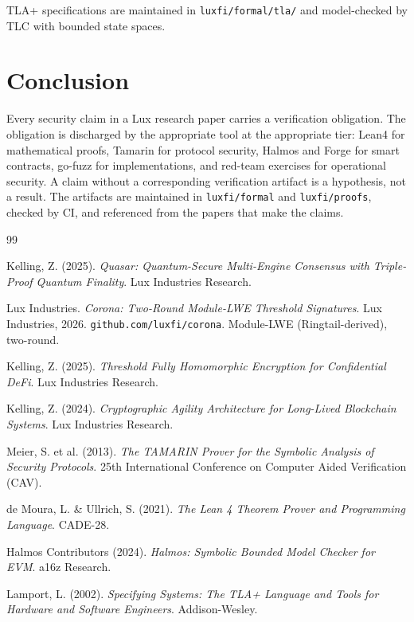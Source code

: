 \documentclass[11pt]{article}
\begin{document}
TLA+ specifications are maintained in \texttt{luxfi/formal/tla/} and model-checked by TLC with bounded state spaces.

\section{Conclusion}

Every security claim in a Lux research paper carries a verification obligation. The obligation is discharged by the appropriate tool at the appropriate tier: Lean4 for mathematical proofs, Tamarin for protocol security, Halmos and Forge for smart contracts, go-fuzz for implementations, and red-team exercises for operational security. A claim without a corresponding verification artifact is a hypothesis, not a result. The artifacts are maintained in \texttt{luxfi/formal} and \texttt{luxfi/proofs}, checked by CI, and referenced from the papers that make the claims.

\begin{thebibliography}{99}

Kelling, Z. (2025).
\textit{Quasar: Quantum-Secure Multi-Engine Consensus with Triple-Proof Quantum Finality}.
Lux Industries Research.

{Lux Industries}.
\textit{Corona: Two-Round Module-LWE Threshold Signatures}.
Lux Industries, 2026. \texttt{github.com/luxfi/corona}.
Module-LWE (Ringtail-derived), two-round.

Kelling, Z. (2025).
\textit{Threshold Fully Homomorphic Encryption for Confidential DeFi}.
Lux Industries Research.

Kelling, Z. (2024).
\textit{Cryptographic Agility Architecture for Long-Lived Blockchain Systems}.
Lux Industries Research.

Meier, S. et al. (2013).
\textit{The TAMARIN Prover for the Symbolic Analysis of Security Protocols}.
25th International Conference on Computer Aided Verification (CAV).

de Moura, L. \& Ullrich, S. (2021).
\textit{The Lean 4 Theorem Prover and Programming Language}.
CADE-28.

Halmos Contributors (2024).
\textit{Halmos: Symbolic Bounded Model Checker for EVM}.
a16z Research.

Lamport, L. (2002).
\textit{Specifying Systems: The TLA+ Language and Tools for Hardware and Software Engineers}.
Addison-Wesley.

\end{thebibliography}
\end{document}

